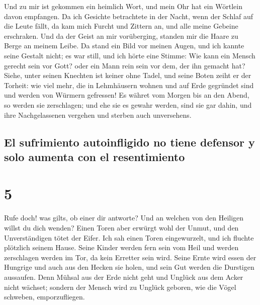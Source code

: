  Und zu mir ist gekommen ein heimlich Wort, und mein Ohr
hat ein Wörtlein davon empfangen.  Da ich Gesichte
betrachtete in der Nacht, wenn der Schlaf auf die Leute fällt,
 da kam mich Furcht und Zittern an, und alle meine
Gebeine erschraken.  Und da der Geist an mir vorüberging,
standen mir die Haare zu Berge an meinem Leibe.  Da stand
ein Bild vor meinen Augen, und ich kannte seine Gestalt nicht; es war
still, und ich hörte eine Stimme:  Wie kann ein Mensch
gerecht sein vor Gott? oder ein Mann rein sein vor dem, der ihn gemacht
hat?  Siehe, unter seinen Knechten ist keiner ohne Tadel,
und seine Boten zeiht er der Torheit:  wie viel mehr, die
in Lehmhäusern wohnen und auf Erde gegründet sind und werden von Würmern
gefressen!  Es währet vom Morgen bis an den Abend, so
werden sie zerschlagen; und ehe sie es gewahr werden, sind sie gar
dahin,  und ihre Nachgelassenen vergehen und sterben auch
unversehens.

\hypertarget{el-sufrimiento-autoinfligido-no-tiene-defensor-y-solo-aumenta-con-el-resentimiento}{%
\subsection{El sufrimiento autoinfligido no tiene defensor y solo
aumenta con el
resentimiento}\label{el-sufrimiento-autoinfligido-no-tiene-defensor-y-solo-aumenta-con-el-resentimiento}}

\hypertarget{section-4}{%
\section{5}\label{section-4}}

 Rufe doch! was gilts, ob einer dir antworte? Und an
welchen von den Heiligen willst du dich wenden?  Einen
Toren aber erwürgt wohl der Unmut, und den Unverständigen tötet der
Eifer.  Ich sah einen Toren eingewurzelt, und ich fluchte
plötzlich seinem Hause.  Seine Kinder werden fern sein vom
Heil und werden zerschlagen werden im Tor, da kein Erretter sein wird.
 Seine Ernte wird essen der Hungrige und auch aus den
Hecken sie holen, und sein Gut werden die Durstigen aussaufen.
 Denn Mühsal aus der Erde nicht geht und Unglück aus dem
Acker nicht wächset;  sondern der Mensch wird zu Unglück
geboren, wie die Vögel schweben, emporzufliegen.

